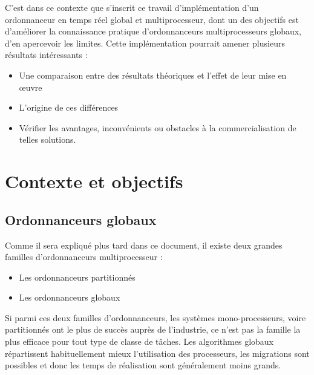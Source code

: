 \documentclass[11pt,a4paper,oneside]{report}
\begin{document}
C'est dans ce contexte que s'inscrit ce travail d'implémentation d'un ordonnanceur en temps réel 
global et multiprocesseur, dont un des objectifs est d'améliorer la connaissance pratique 
d'ordonnanceurs multiprocesseurs globaux, d'en apercevoir les limites. 
Cette implémentation pourrait amener plusieurs résultats intéressants : \\
\begin{itemize}
	\item Une comparaison entre des résultats théoriques et l'effet de leur mise 
	en \oe{}uvre
	\item L'origine de ces différences
	\item Vérifier les avantages, inconvénients ou obstacles à la 
	commercialisation de telles solutions.
\end{itemize}

\section{Contexte et objectifs}



\subsection{Ordonnanceurs globaux}
Comme il sera expliqué plus tard dans ce document, il existe deux grandes familles d'ordonnanceurs 
multiprocesseur :\\
\begin{itemize}
	\item Les ordonnanceurs partitionnés
	\item Les ordonnanceurs globaux
\end{itemize}
Si parmi ces deux familles d'ordonnanceurs, les systèmes mono-processeurs, voire 
partitionnés ont le plus de succès auprès de l'industrie, 
ce n'est pas la famille la plus efficace pour tout type de classe de tâches. 
Les algorithmes globaux répartissent habituellement mieux l'utilisation des processeurs, 
les migrations sont possibles et donc les temps de réalisation sont généralement moins grands.
\\ %
\end{document}
